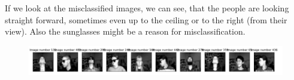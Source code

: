 \begin{figure}%
    \centering
    \caption{}%
    \label{fig:example}%
\end{figure}
\begin{figure}%
    \centering
    \caption{}%
    \label{fig:example}%
\end{figure}
\newpage
If we look at the misclassified images, we can see, that the people are looking straight forward, sometimes even up to the ceiling or to the right (from their view). Also the sunglasses might be a reason for misclassification.

\begin{figure}[!htbp]
	\centering
        \includegraphics[width=14cm]{2_2_missclassified}
	\caption{}
\end{figure}




